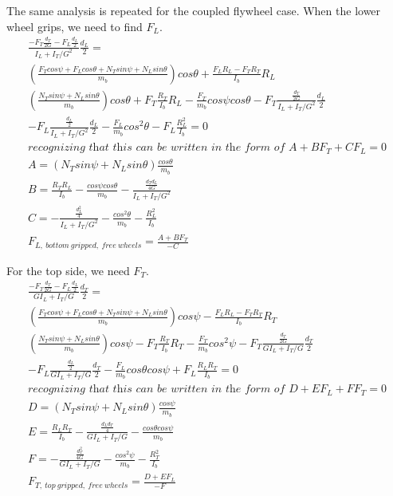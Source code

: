 \documentclass[10pt,letterpaper]{article}
\begin{document}
The same analysis is repeated for the coupled flywheel case. When the lower wheel grips, we need to find $F_L$.
\begin{align}
	\frac{- F_T \frac{d_T}{2 G} - F_L \frac{d_L}{2}}{I_L + I_T / G^2} \frac{d_L}{2} = \nonumber \\
	(\frac{F_T cos \psi + F_L cos \theta + N_T sin \psi + N_L sin \theta}{m_b}) cos \theta + \frac{F_L R_L - F_T R_T}{I_b} R_L \\
	(\frac{N_T sin \psi + N_L sin \theta}{m_b}) cos \theta + F_T \frac{R_T}{I_b} R_L - \frac{F_T}{m_b} cos \psi cos \theta - F_T \frac{\frac{d_T}{2 G}}{I_L + I_T / G^2} \frac{d_L}{2} \nonumber \\
	- F_L \frac{\frac{d_L}{2}}{I_L + I_T / G^2} \frac{d_L}{2} - \frac{F_L}{m_b} cos^2 \theta - F_L \frac{R_L^2}{I_b} = 0\\
	\textit{recognizing that this can be written in the form of } A + B F_T + C F_L = 0 \\
	A = (N_T sin \psi + N_L sin \theta) \frac{cos \theta}{m_b} \\
	B = \frac{R_T R_L}{I_b} - \frac{cos \psi cos \theta}{m_b} - \frac{\frac{d_T d_L}{4 G}}{I_L + I_T / G^2} \\
	C = - \frac{\frac{d_L^2}{4}}{I_L + I_T / G^2} - \frac{cos^2 \theta}{m_b} - \frac{R_L^2}{I_b} \\
	F_{L,\ bottom\ gripped,\ free\ wheels} = \frac{A + B F_T}{- C}
\end{align}

For the top side, we need $F_T$.
\begin{align}
	\frac{- F_T \frac{d_T}{2 G} - F_L \frac{d_L}{2}}{G I_L + I_T / G} \frac{d_T}{2} = \nonumber \\
	(\frac{F_T cos \psi + F_L cos \theta + N_T sin \psi + N_L sin \theta}{m_b}) cos \psi - \frac{F_L R_L - F_T R_T}{I_b} R_T \\
	(\frac{N_T sin \psi + N_L sin \theta}{m_b}) cos \psi - F_T \frac{R_T}{I_b} R_T - \frac{F_T}{m_b} cos^2 \psi - F_T \frac{\frac{d_T}{2 G}}{G I_L + I_T / G} \frac{d_T}{2} \nonumber \\
	- F_L \frac{\frac{d_L}{2}}{G I_L + I_T / G} \frac{d_T}{2} - \frac{F_L}{m_b} cos \theta cos \psi + F_L \frac{R_L R_T}{I_b} = 0 \\
	\textit{recognizing that this can be written in the form of } D + E F_L + F F_T = 0 \\
	D = (N_T sin \psi + N_L sin \theta) \frac{cos \psi}{m_b} \\
	E = \frac{R_L R_T}{I_b} - \frac{\frac{d_L d_T}{4}}{G I_L + I_T / G} - \frac{cos \theta cos \psi}{m_b} \\
	F = - \frac{\frac{d_T^2}{4 G}}{G I_L + I_T / G} - \frac{cos^2 \psi}{m_b} - \frac{R_T^2}{I_b} \\
	F_{T,\ top\ gripped,\ free\ wheels} = \frac{D + E F_L}{- F}
\end{align}
\end{document}
